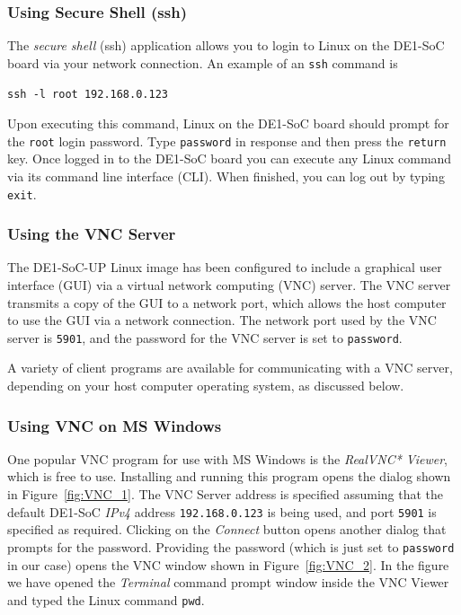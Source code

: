 \documentclass[11pt, twoside, pdftex]{article}
\begin{document}
\subsubsection{Using Secure Shell (ssh)}
\label{sec:ssh}

The {\it secure shell} (ssh) application allows you to login to Linux on the DE1-SoC
board via your network connection.  An example of an \texttt{ssh} command is

\texttt{ssh -l root 192.168.0.123}

Upon executing this command, Linux on the DE1-SoC board should prompt for the \texttt{root} 
login password. Type \texttt{password} in response and then press the \texttt{return} key. 
Once logged in to the DE1-SoC board you can execute any Linux command via its command line 
interface (CLI).  When finished, you can log out by typing \texttt{exit}.

\subsubsection{Using the VNC Server}
\label{sec:VNC}
The DE1-SoC-UP Linux image has been configured to include 
a graphical user interface (GUI) via a virtual network computing (VNC) server. The 
VNC server transmits a copy of the GUI to a network port, which allows the host computer 
to use the GUI via a network connection. The network port used 
by the VNC server is \texttt{5901}, and the password for the VNC server is set to
\texttt{password}.

A variety of client programs are available for communicating with a VNC server, depending
on your host computer operating system, as discussed below.

\subsubsection{Using VNC on MS Windows}

One popular VNC program for use with MS Windows is the {\it RealVNC* Viewer}, which is 
free to use. Installing and running this program opens the dialog shown in Figure~\ref{fig:VNC_1}.
The VNC Server address is specified assuming that the default DE1-SoC {\it IPv4} address
\texttt{192.168.0.123} is being used, and port \texttt{5901} is specified as required. Clicking 
on the {\it Connect} button opens another dialog that prompts for the 
password. Providing the password (which is just set to \texttt{password} in our case) opens the 
VNC window shown in Figure~\ref{fig:VNC_2}. In the figure we have opened the {\it Terminal}
command prompt window inside the VNC Viewer and typed the Linux command \texttt{pwd}.
\end{document}

